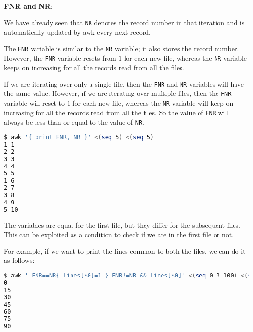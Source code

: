 \textbf{FNR and NR}:

We have already seen that \lstinline|NR| denotes the record number in that iteration and is automatically updated by awk every next record.

The \lstinline|FNR| variable is similar to the \lstinline|NR| variable; it also stores the record number.
However, the \lstinline|FNR| variable resets from $1$ for each new file, whereas the \lstinline|NR| variable keeps on increasing for all the records read from all the files.

If we are iterating over only a single file, then the \lstinline|FNR| and \lstinline|NR| variables will have the same value.
However, if we are iterating over multiple files, then the \lstinline|FNR| variable will reset to $1$ for each new file, whereas the \lstinline|NR| variable will keep on increasing for all the records read from all the files.
So the value of \lstinline|FNR| will always be less than or equal to the value of \lstinline|NR|.

\begin{lstlisting}[language=bash]
$ awk '{ print FNR, NR }' <(seq 5) <(seq 5)
1 1
2 2
3 3
4 4
5 5
1 6
2 7
3 8
4 9
5 10
\end{lstlisting}

The variables are equal for the first file, but they differ for the subsequent files.
This can be exploited as a condition to check if we are in the first file or not.

For example, if we want to print the lines common to both the files, we can do it as follows:

\begin{lstlisting}[language=bash]
$ awk ' FNR==NR{ lines[$0]=1 } FNR!=NR && lines[$0]' <(seq 0 3 100) <(seq 0 5 100)
0
15
30
45
60
75
90
\end{lstlisting}

